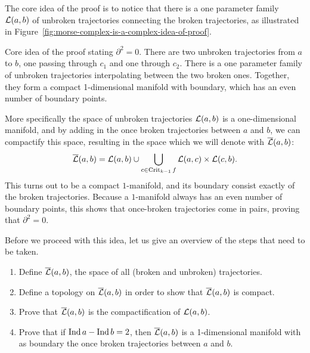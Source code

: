 The core idea of the proof is to notice that there is a one parameter family $\mathcal L(a, b)$ of unbroken trajectories connecting the broken trajectories, as illustrated in Figure~\ref{fig:morse-complex-is-a-complex-idea-of-proof}.
\begin{marginfigure}
    \centering
    \caption{
        Core idea of the proof stating $\partial^2 = 0$.
        There are two unbroken trajectories from $a$ to $b$, one passing through $c_1$ and one through $c_2$.
        There is a one parameter family of unbroken trajectories interpolating between the two broken ones.
        Together, they form a compact 1-dimensional manifold with boundary, which has an even number of boundary points.
    }
    \label{fig:morse-complex-is-a-complex-idea-of-proof}
\end{marginfigure}
More specifically the space of unbroken trajectories $\mathcal L(a, b) $ is a one-dimensional manifold, and by adding in the once broken trajectories between $a$ and $b$, we can compactify this space, resulting in the space which we will denote with $\overline{\mathcal L}(a, b)$:
\[
\overline{\mathcal L}(a, b) = \mathcal L(a, b) \cup \bigcup_{c \in \operatorname{Crit}_{k-1} f} \mathcal L(a, c) \times \mathcal L(c, b)
.\] 
This turns out to be a compact $1$-manifold, and its boundary consist exactly of the broken trajectories.
Because a $1$-manifold always has an even number of boundary points, this shows that once-broken trajectories come in pairs, proving that  $\partial^2 = 0$.

Before we proceed with this idea, let us give an overview of the steps that need to be taken.

\begin{enumerate}
    \item Define $\overline{\mathcal L}(a, b)$, the space of all (broken and unbroken) trajectories.
    \item Define a topology on $\overline{\mathcal L}(a, b)$ in order to show that $\overline{\mathcal L}(a, b)$ is compact.
    \item Prove that  $\overline{\mathcal L}(a, b)$ is the compactification of $\mathcal L(a, b)$.
    \item Prove that if $\operatorname{Ind} a - \operatorname{Ind} b = 2$, then $\overline{\mathcal L}(a, b)$ is a 1-dimensional manifold with as boundary the once broken trajectories between $a$ and  $b$.
\end{enumerate}

